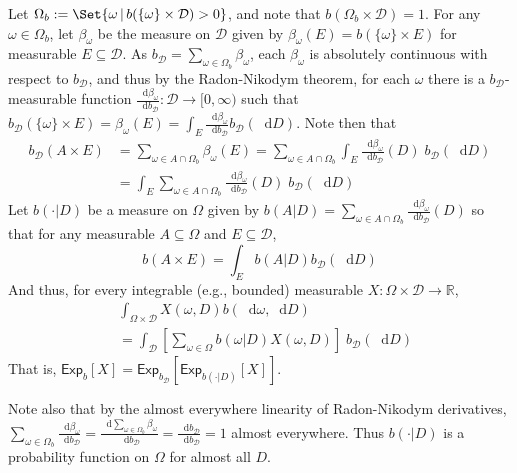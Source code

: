 \documentclass[a4paper]{article}
\newcommand\A{\mathcal{A}}
\newcommand\Exp{\mathsf{Exp}}
\newcommand\U{\mathfrak{U}} %
\newcommand{\Decs}{\mathcal{D}}
\renewcommand{\Re}{\mathbb{R}}
\renewcommand{\color}[1]{}
\newenvironment{colored}[1]{\leavevmode\color{#1}}{}
\newcommand\SetDelimiter[1][]{
	\nonscript\,#1\vert \allowbreak \nonscript\,\mathopen{}}
\providecommand\given{\SetDelimiter}
\newcommand*\diff{\mathop{}\!\mathrm{d}}
\newenvironment{CCM rewritten}
{\begingroup\color{blue}} %
{\endgroup}              %
\begin{document}
\begin{colored}{violet}
Let $\Omega_b:=\Set{\omega\given b(\{\omega\}\times\Decs)>0}$, and note that $b(\Omega_b\times\Decs)=1$. For any $\omega\in \Omega_b$, let $\beta_\omega$ be the measure on $\Decs$ given by $\beta_\omega(E)=b(\{\omega\}\times E)$ for measurable $E\subseteq \Decs$. 
As $b_\Decs=\sum_{\omega\in\Omega_b}\beta_\omega$, each $\beta_\omega$ is absolutely continuous with respect to $b_\Decs$, and thus by the Radon-Nikodym theorem, for each $\omega$ there is a $b_\Decs$-measurable function $\frac{\diff \beta_\omega}{\diff b_\Decs}:\Decs\to[0,\infty)$ such that $b_\Decs(\{\omega\}\times E)=\beta_\omega(E)=\int_E \frac{\diff \beta_\omega}{\diff b_\Decs}b_\Decs(\diff D)$.
Note then that \begin{align}
	b_\Decs(A\times E)&=\sum_{\omega\in A\cap \Omega_b}\beta_\omega(E)=\sum_{\omega\in A\cap \Omega_b}\int_E \frac{\diff \beta_\omega}{\diff b_\Decs}(D)\;b_\Decs(\diff D)\\
	&=\int_E\sum_{\omega\in A\cap \Omega_b} \frac{\diff \beta_\omega}{\diff b_\Decs}(D)\;b_\Decs(\diff D)
\end{align}
Let $b(\cdot|D)$ be a measure on $\Omega$ given by $b(A|D)=\sum_{\omega\in A\cap \Omega_b} \frac{\diff \beta_\omega}{\diff b_\Decs}(D)$ so that for any measurable $A\subseteq\Omega$ and $E\subseteq\Decs$, 
\[
b(A\times E)=\int_E b(A|D) b_\Decs(\diff D)
\]
And thus,  for every integrable (e.g., bounded) measurable $X:\Omega\times\Decs\to\Re$, \begin{align}
	&\int_{\Omega\times \Decs} X(\omega,D) b(\diff \omega, \diff D)\\
	&=\int_\Decs \left[\sum_{\omega\in\Omega} b(\omega|D)X(\omega,D)\right]\;b_\Decs(\diff D)
\end{align}
That is, $\Exp_b[X]=\Exp_{b_\Decs}[\Exp_{b(\cdot|D)}[X]]$.

Note also that by the almost everywhere linearity of Radon-Nikodym derivatives, $\sum_{\omega\in\Omega_b}\frac{\diff \beta_\omega}{\diff b_\Decs}=\frac{\diff \sum_{\omega\in\Omega_b}\beta_\omega}{\diff b_\Decs}=\frac{\diff b_\Decs}{\diff b_\Decs}=1$ almost everywhere. Thus $b(\cdot|D)$ is a probability function on $\Omega$ for almost all $D$.





\end{colored}
\end{document}
